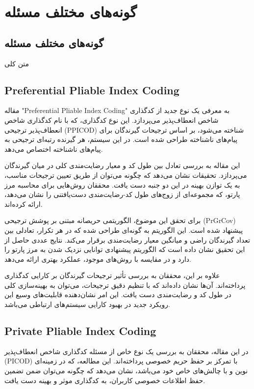 
\chapter{
    گونه‌های مختلف مسئله
}
\section{
    گونه‌های مختلف مسئله
}
متن کلی


\section{Preferential Pliable Index Coding}


مقاله "Preferential Pliable Index Coding" به معرفی یک نوع جدید از کدگذاری شاخص انعطاف‌پذیر می‌پردازد. این نوع کدگذاری، که با نام کدگذاری شاخص انعطاف‌پذیر ترجیحی (PPICOD) شناخته می‌شود، بر اساس ترجیحات گیرندگان برای پیام‌های ناشناخته طراحی شده است. در این سیستم، هر گیرنده رتبه‌ای ترجیحی به پیام‌های ناشناخته اختصاص می‌دهد.

این مقاله به بررسی تعادل بین طول کد و معیار رضایت‌مندی کلی در میان گیرندگان می‌پردازد. تحقیقات نشان می‌دهد که چگونه می‌توان از طریق تعیین ترجیحات مناسب، به یک توازن بهینه در این دو جنبه دست یافت. محققان روش‌هایی برای محاسبه مرز پارتو، که مجموعه‌ای از زوج‌های طول کد-رضایت‌مندی دست‌یافتنی را نشان می‌دهد، ارائه کرده‌اند.

برای تحقق این موضوع، الگوریتمی حریصانه مبتنی بر پوشش ترجیحی (PrGrCov) پیشنهاد شده است. این الگوریتم به گونه‌ای طراحی شده که در هر تکرار، تعادلی بین تعداد گیرندگان راضی و میانگین معیار رضایت‌مندی برقرار می‌کند. نتایج عددی حاصل از این تحقیق نشان داده است که الگوریتم پیشنهادی توانایی نزدیک شدن به مرز پارتو را دارد و در مقایسه با روش‌های موجود، عملکرد بهتری ارائه می‌دهد.

علاوه بر این، محققان به بررسی تأثیر ترجیحات گیرندگان بر کارایی کدگذاری پرداخته‌اند. آن‌ها نشان داده‌اند که با تنظیم دقیق ترجیحات، می‌توان به بهینه‌سازی کلی در طول کد و رضایت‌مندی دست یافت. این امر نشان‌دهنده قابلیت‌های وسیع این رویکرد جدید در بهبود کارایی سیستم‌های ارتباطی می‌باشد.


\section*{ Private Pliable Index Coding}

در این مقاله، محققان به بررسی یک نوع خاص از مسئله کدگذاری شاخص انعطاف‌پذیر (PICOD) با تمرکز بر حفظ حریم خصوصی پرداخته‌اند. این مطالعه، که در زمینه‌ای نوین و با چالش‌های خاص خود می‌باشد، نشان می‌دهد که چگونه می‌توان ضمن تضمین حفظ اطلاعات خصوصی کاربران، به کدگذاری موثر و بهینه دست یافت.

